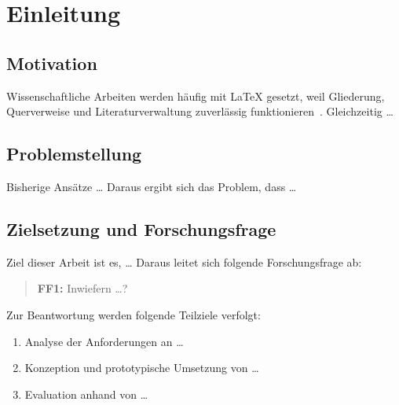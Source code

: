 \chapter{Einleitung}
\label{cha:einleitung}


\section{Motivation}
\label{sec:motivation}

Wissenschaftliche Arbeiten werden häufig mit \LaTeX{} gesetzt, weil Gliederung,
Querverweise und Literaturverwaltung zuverlässig funktionieren~\cite{lamport1994latex}.
Gleichzeitig \ldots

\section{Problemstellung}
\label{sec:problemstellung}

Bisherige Ansätze \ldots{} Daraus ergibt sich das Problem, dass \ldots

\section{Zielsetzung und Forschungsfrage}
\label{sec:zielsetzung}

Ziel dieser Arbeit ist es, \ldots{} Daraus leitet sich folgende Forschungsfrage ab:

\begin{quote}
  \textbf{FF1:} Inwiefern \ldots?
\end{quote}

Zur Beantwortung werden folgende Teilziele verfolgt:
\begin{enumerate}
  \item Analyse der Anforderungen an \ldots
  \item Konzeption und prototypische Umsetzung von \ldots
  \item Evaluation anhand von \ldots
\end{enumerate}

